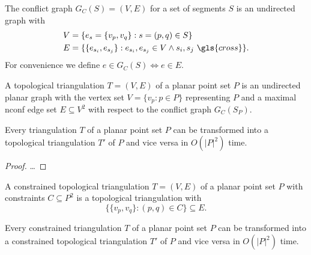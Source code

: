 
\begin{definition}\label{def:conflict_graph}
  The conflict graph \(G_C(S) = (V,E)\) for a set of segments \(S\)
  is an undirected graph with
  \begin{alignat*}{1}
    V &= \{e_s = \{v_p, v_q\} : s = (p,q) \in S\} \\
    E &= \{
      \{e_{s_i}, e_{s_j}\} : 
      e_{s_i}, e_{s_j} \in V 
      \land s_i, s_j~\gls{cross}
    \}.
  \end{alignat*}
  For convenience we define \(e \in G_C(S) \iff e \in E\).
\end{definition}


\begin{definition}
  A topological triangulation \(T=(V,E)\) of a planar point set \(P\)
  is an undirected planar graph with the vertex set
  \( V = \{v_p : p \in P\} \)
  representing \(P\) and a maximal \gls{nconf} edge set
  \(E \subseteq V^2\) with respect to the conflict graph
  \(G_C(S_P)\).
\end{definition}


\begin{theorem}
  Every triangulation \(T\) of a planar point set \(P\) can be
  transformed into a topological triangulation \(T'\) of \(P\)
  and vice versa in \(O(|P|^2)\) time.
\end{theorem}

\begin{proof}
  \ldots{}
\end{proof}


\begin{definition}
  \label{def:constr_top_triangulation}
  A constrained topological triangulation \(T=(V,E)\) of a planar
  point set \(P\) with constraints \(C \subseteq P^2\) is a
  topological triangulation with
  \[
    \{\{v_p,v_q\} : (p,q) \in C\} \subseteq E.
  \]
\end{definition}

\begin{theorem}
  Every constrained triangulation \(T\) of a planar point set \(P\) can be
  transformed into a constrained topological triangulation \(T'\) of \(P\)
  and vice versa in \(O(|P|^2)\) time.
\end{theorem}

